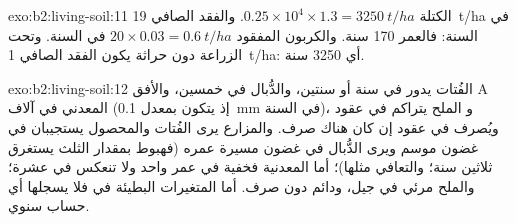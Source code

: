 \begin{solution}{exo:b2:living-soil:11}
الكتلة $0.25\times 10^{4}\times 1.3 = \qty{3250}{t/ha}$. والفقد الصافي
\qty{19}{t/ha} في السنة: فالعمر 170 سنة. والكربون المفقود $20\times
0.03 = \qty{0.6}{t/ha}$ في السنة. وتحت الزراعة دون حراثة يكون الفقد الصافي
\qty{1}{t/ha}: أي 3250 سنة.
\end{solution}

\begin{solution}{exo:b2:living-soil:12}
الفُتات يدور في سنة أو سنتين، والدُّبال في خمسين، والأفق A
المعدني في آلاف (إذ يتكون بمعدل \qty{0.1}{mm} في السنة)، و
الملح يتراكم في عقود ويُصرف في عقود إن كان هناك
صرف. والمزارع يرى الفُتات والمحصول يستجيبان في غضون
موسم ويرى الدُّبال في غضون مسيرة عمره (فهبوط بمقدار الثلث يستغرق
ثلاثين سنة؛ والتعافي مثلها)؛ أما  المعدنية
فخفية في عمر واحد ولا تنعكس في عشرة؛ والملح
مرئي في جيل، ودائم دون صرف. أما
المتغيرات البطيئة في  فلا يسجلها أي حساب سنوي.
\end{solution}

